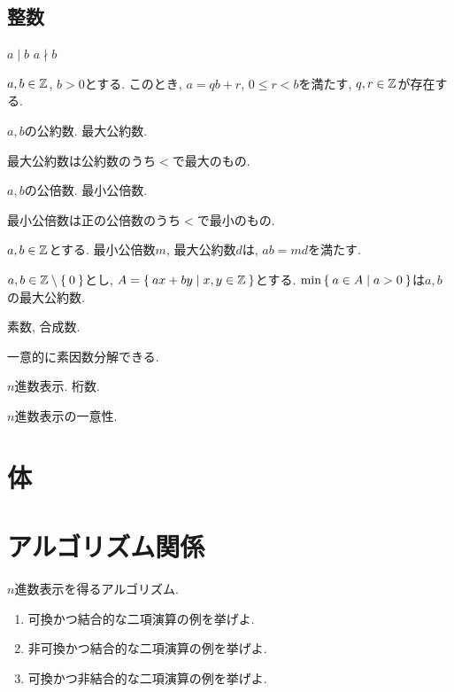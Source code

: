   \section{整数}
  \begin{definition}
    $a \mid b$
    $a\nmid b$
  \end{definition}
  \begin{theorem}
    $a,b\in\mathbb{Z}$, $b>0$とする.
    このとき,
    $a=qb+r$, $0\leq r < b$を満たす, $q,r\in\mathbb{Z}$が存在する.
  \end{theorem}
  \begin{definition}
    $a,b$の公約数. 最大公約数.
  \end{definition}
  \begin{prop}
    最大公約数は公約数のうち$<$で最大のもの.
  \end{prop}
  \begin{definition}
    $a,b$の公倍数. 最小公倍数.
  \end{definition}
  \begin{prop}
    最小公倍数は正の公倍数のうち$<$で最小のもの.
  \end{prop}
  \begin{prop}
    $a,b\in\mathbb{Z}$とする.
    最小公倍数$m$, 最大公約数$d$は,
    $ab=md$を満たす.
  \end{prop}
  
  \begin{prop}
    $a,b\in\mathbb{Z}\setminus\Set{0}$とし,
    $A=\Set{ax+by|x,y\in\mathbb{Z}}$とする.
    $\min\Set{a\in A|a>0}$は$a,b$の最大公約数.
  \end{prop}

  \begin{definition}
    素数, 合成数.
  \end{definition}

  \begin{prop}
    一意的に素因数分解できる.
  \end{prop}

  \begin{definition}
    $n$進数表示.
    桁数.
  \end{definition}
  \begin{prop}
    $n$進数表示の一意性.
  \end{prop}
  \chapter{体}


  \chapter{アルゴリズム関係}
  $n$進数表示を得るアルゴリズム.
  
\begin{enumerate}
\item 可換かつ結合的な二項演算の例を挙げよ.
\item 非可換かつ結合的な二項演算の例を挙げよ.
\item 可換かつ非結合的な二項演算の例を挙げよ.
\end{enumerate}



    
